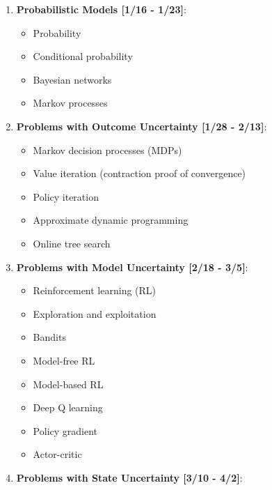 \documentclass[9pt]{article}
\begin{document}
\begin{enumerate}[noitemsep]
    \item \textbf{Probabilistic Models [1/16 - 1/23]}:
        \begin{multicols}{2}
            \begin{itemize}[noitemsep]
                \item Probability
                \item Conditional probability
                \item Bayesian networks
                \item Markov processes
            \end{itemize}
        \end{multicols}
    \item \textbf{Problems with Outcome Uncertainty [1/28 - 2/13]}:
        \begin{multicols}{2}
        \begin{itemize}[noitemsep]
            \item Markov decision processes (MDPs)
            \item Value iteration (contraction proof of convergence)
            \item Policy iteration
            \item Approximate dynamic programming
            \item Online tree search
        \end{itemize}
        \end{multicols}
    \item \textbf{Problems with Model Uncertainty [2/18 - 3/5]}:
        \begin{multicols}{2}
        \begin{itemize}[noitemsep]
            \item Reinforcement learning (RL)
            \item Exploration and exploitation
            \item Bandits
            \item Model-free RL
            \item Model-based RL
            \item Deep Q learning
            \item Policy gradient
            \item Actor-critic
        \end{itemize}
        \end{multicols}
    \item \textbf{Problems with State Uncertainty [3/10 - 4/2]}:

\end{enumerate}
\end{document}
